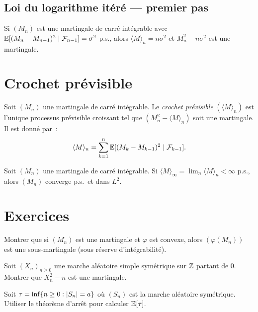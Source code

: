 \subsection{Loi du logarithme it\'er\'e --- premier pas}

\begin{proposition}
Si $(M_n)$ est une martingale de carr\'e int\'egrable avec
$\mathbb{E}[(M_n - M_{n-1})^2 \mid \mathcal{F}_{n-1}] = \sigma^2$ p.s., alors
$\langle M \rangle_n = n\sigma^2$ et $M_n^2 - n\sigma^2$ est une martingale.
\end{proposition}

\section{Crochet pr\'evisible}

\begin{definition}
Soit $(M_n)$ une martingale de carr\'e int\'egrable. Le \emph{crochet pr\'evisible}
$(\langle M \rangle_n)$ est l'unique processus pr\'evisible croissant tel que
$(M_n^2 - \langle M \rangle_n)$ soit une martingale. Il est donn\'e par~:
\[
  \langle M \rangle_n = \sum_{k=1}^{n} \mathbb{E}[(M_k - M_{k-1})^2 \mid \mathcal{F}_{k-1}].
\]
\end{definition}

\begin{theoreme}
\label{thm:convergence_crochet}
Soit $(M_n)$ une martingale de carr\'e int\'egrable. Si
$\langle M \rangle_{\infty} = \lim_{n} \langle M \rangle_n < \infty$ p.s.,
alors $(M_n)$ converge p.s.\ et dans $L^2$.
\end{theoreme}

\section{Exercices}

\begin{exercice}
Montrer que si $(M_n)$ est une martingale et $\varphi$ est convexe, alors
$(\varphi(M_n))$ est une sous-martingale (sous r\'eserve d'int\'egrabilit\'e).
\end{exercice}

\begin{exercice}
Soit $(X_n)_{n \geq 0}$ une marche al\'eatoire simple sym\'etrique sur $\mathbb{Z}$ partant
de $0$. Montrer que $X_n^2 - n$ est une martingale.
\end{exercice}

\begin{exercice}
Soit $\tau = \inf\{n \geq 0 : \left| S_n \right| = a\}$ o\`u $(S_n)$ est la marche
al\'eatoire sym\'etrique. Utiliser le th\'eor\`eme d'arr\^et pour calculer $\mathbb{E}[\tau]$.
\end{exercice}

